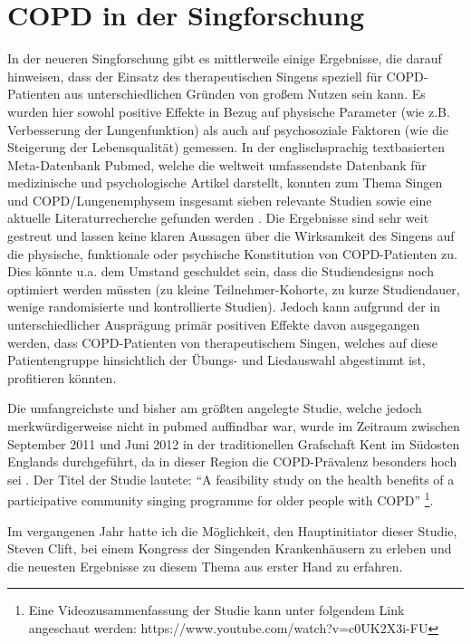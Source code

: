 \section{COPD in der Singforschung}
\label{copd_in_der_singforschung}
In der neueren Singforschung gibt es mittlerweile einige Ergebnisse, die darauf hinweisen, dass der Einsatz des therapeutischen Singens speziell für COPD-Patienten aus unterschiedlichen Gründen von großem Nutzen sein kann. Es wurden hier sowohl positive Effekte in Bezug auf physische Parameter (wie z.B. Verbesserung der Lungenfunktion) als auch auf psychosoziale Faktoren (wie die Steigerung der Lebensqualität) gemessen.
In der englischsprachig textbasierten Meta-Datenbank Pubmed, welche die weltweit umfassendste Datenbank für medizinische und psychologische Artikel darstellt, konnten zum Thema Singen und COPD/Lungenemphysem insgesamt sieben relevante Studien sowie eine aktuelle Literaturrecherche gefunden werden \autocite{pmid19436683,pmid20175359,pmid20682030,pmid23145504,pmid23497924,pmid23497929,pmid24398814,pmid24793633}. Die Ergebnisse sind sehr weit gestreut und lassen keine klaren Aussagen über die Wirksamkeit des Singens auf die physische, funktionale oder psychische Konstitution von COPD-Patienten zu. Dies könnte u.a. dem Umstand geschuldet sein, dass die Studiendesigns noch optimiert werden müssten (zu kleine Teilnehmer-Kohorte, zu kurze Studiendauer, wenige randomisierte und kontrollierte Studien). Jedoch kann aufgrund der in unterschiedlicher Ausprägung primär positiven Effekte davon ausgegangen werden, dass COPD-Patienten von therapeutischem Singen, welches auf diese Patientengruppe hinsichtlich der Übungs- und Liedauswahl abgestimmt ist, profitieren könnten.

Die umfangreichste und bisher am größten angelegte Studie, welche jedoch merkwürdigerweise nicht in pubmed auffindbar war, wurde im Zeitraum zwischen September 2011 und Juni 2012 in der traditionellen Grafschaft Kent im Südosten Englands durchgeführt, da in dieser Region die COPD-Prävalenz besonders hoch sei \autocite[vgl.][4]{clift2013}. Der Titel der Studie lautete: "`A feasibility study on the health benefits of a participative community singing programme for older people with COPD"' \footnote{Eine Videozusammenfassung der Studie kann unter folgendem Link angeschaut werden: https://www.youtube.com/watch?v=c0UK2X3i-FU}.

Im vergangenen Jahr hatte ich die Möglichkeit, den Hauptinitiator dieser Studie, Steven Clift, bei einem Kongress der Singenden Krankenhäusern zu erleben und die neuesten Ergebnisse zu diesem Thema aus erster Hand zu erfahren. 

